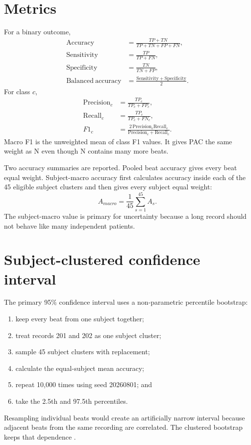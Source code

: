 \section{Metrics}

For a binary outcome,
\begin{align}
 \mathrm{Accuracy}&=\frac{TP+TN}{TP+TN+FP+FN},\\
 \mathrm{Sensitivity}&=\frac{TP}{TP+FN},\\
 \mathrm{Specificity}&=\frac{TN}{TN+FP},\\
 \mathrm{Balanced\ accuracy}&=\frac{\mathrm{Sensitivity}+\mathrm{Specificity}}{2}.
\end{align}
For class $c$,
\begin{align}
 \mathrm{Precision}_c&=\frac{TP_c}{TP_c+FP_c},\\
 \mathrm{Recall}_c&=\frac{TP_c}{TP_c+FN_c},\\
 F1_c&=\frac{2\,\mathrm{Precision}_c\mathrm{Recall}_c}
 {\mathrm{Precision}_c+\mathrm{Recall}_c}.
\end{align}
Macro F1 is the unweighted mean of class F1 values. It gives PAC the same
weight as N even though N contains many more beats.

Two accuracy summaries are reported. Pooled beat accuracy gives every beat
equal weight. Subject-macro accuracy first calculates accuracy inside each of
the 45 eligible subject clusters and then gives every subject equal weight:
\begin{equation}
 A_{macro}=\frac{1}{45}\sum_{s=1}^{45}A_s.
 \label{eq:subject-macro}
\end{equation}
The subject-macro value is primary for uncertainty because a long record should
not behave like many independent patients.

\section{Subject-clustered confidence interval}

The primary 95\% confidence interval uses a non-parametric percentile
bootstrap:
\begin{enumerate}
    \item keep every beat from one subject together;
    \item treat records 201 and 202 as one subject cluster;
    \item sample 45 subject clusters with replacement;
    \item calculate the equal-subject mean accuracy;
    \item repeat 10,000 times using seed 20260801; and
    \item take the 2.5th and 97.5th percentiles.
\end{enumerate}
Resampling individual beats would create an artificially narrow interval
because adjacent beats from the same recording are correlated. The clustered
bootstrap keeps that dependence \cite{rutter2000clustered}.

